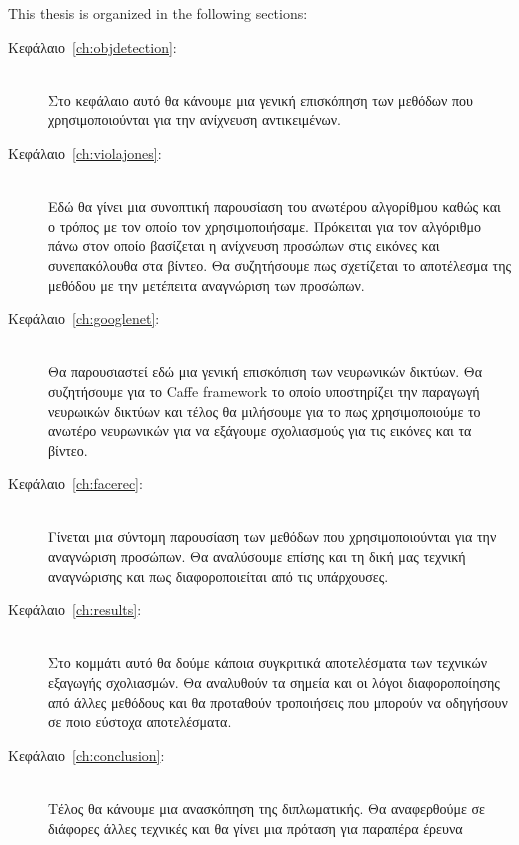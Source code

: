 This thesis is organized in the following sections:

\begin{description}
  \item[Κεφάλαιο~\ref{ch:objdetection}:] \hfill \\
    Στο κεφάλαιο αυτό θα κάνουμε μια γενική επισκόπηση των μεθόδων που
    χρησιμοποιούνται για την ανίχνευση αντικειμένων.
  \item[Κεφάλαιο~\ref{ch:violajones}:] \hfill \\
    Εδώ θα γίνει μια συνοπτική παρουσίαση του ανωτέρου αλγορίθμου καθώς
    και ο τρόπος με τον οποίο τον χρησιμοποιήσαμε. Πρόκειται για τον αλγόριθμο
    πάνω στον οποίο βασίζεται η ανίχνευση προσώπων στις εικόνες και συνεπακόλουθα
    στα βίντεο. Θα συζητήσουμε πως σχετίζεται το αποτέλεσμα της μεθόδου με
    την μετέπειτα αναγνώριση των προσώπων.
  \item[Κεφάλαιο~\ref{ch:googlenet}:] \hfill \\
    Θα παρουσιαστεί εδώ μια γενική επισκόπιση των νευρωνικών δικτύων. Θα συζητήσουμε
    για το Caffe framework το οποίο υποστηρίζει την παραγωγή νευρωικών δικτύων
    και τέλος θα μιλήσουμε για το πως χρησιμοποιούμε το ανωτέρο νευρωνικών
    για να εξάγουμε σχολιασμούς για τις εικόνες και τα βίντεο.
  \item[Κεφάλαιο~\ref{ch:facerec}:] \hfill \\
    Γίνεται μια σύντομη παρουσίαση των μεθόδων που χρησιμοποιούνται για την
    αναγνώριση προσώπων. Θα αναλύσουμε επίσης και τη δική μας τεχνική αναγνώρισης
    και πως διαφοροποιείται από τις υπάρχουσες.
  \item[Κεφάλαιο~\ref{ch:results}:] \hfill \\
    Στο κομμάτι αυτό θα δούμε κάποια συγκριτικά αποτελέσματα των τεχνικών
    εξαγωγής σχολιασμών. Θα αναλυθούν τα σημεία και οι λόγοι διαφοροποίησης
    από άλλες μεθόδους και θα προταθούν τροποιήσεις που μπορούν να οδηγήσουν
    σε ποιο εύστοχα αποτελέσματα.
  \item[Κεφάλαιο~\ref{ch:conclusion}:] \hfill \\
    Τέλος θα κάνουμε μια ανασκόπηση της διπλωματικής. Θα αναφερθούμε σε διάφορες
    άλλες τεχνικές και θα γίνει μια πρόταση για παραπέρα έρευνα
\end{description}
